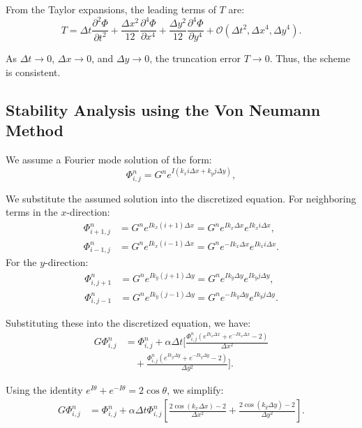 \documentclass{article}
\begin{document}
From the Taylor expansions, the leading terms of \( T \) are:
\begin{equation}
T = \Delta t \frac{\partial^2 \Phi}{\partial t^2} + \frac{\Delta x^2}{12} \frac{\partial^4 \Phi}{\partial x^4} + \frac{\Delta y^2}{12} \frac{\partial^4 \Phi}{\partial y^4} + \mathcal{O}(\Delta t^2, \Delta x^4, \Delta y^4).
\end{equation}

As \( \Delta t \to 0 \), \( \Delta x \to 0 \), and \( \Delta y \to 0 \), the truncation error \( T \to 0 \). Thus, the scheme is consistent.

\subsection{ Stability Analysis using the Von Neumann Method}
We assume a Fourier mode solution of the form:
\begin{equation}
\Phi_{i,j}^n = G^n e^{I(k_x i \Delta x + k_y j \Delta y)},
\end{equation}

We substitute the assumed solution into the discretized equation. For neighboring terms in the \( x \)-direction:
\begin{align}
\Phi_{i+1,j}^n &= G^n e^{I k_x (i+1) \Delta x} = G^n e^{I k_x \Delta x} e^{I k_x i \Delta x}, \\
\Phi_{i-1,j}^n &= G^n e^{I k_x (i-1) \Delta x} = G^n e^{-I k_x \Delta x} e^{I k_x i \Delta x}.
\end{align}
For the \( y \)-direction:
\begin{align}
\Phi_{i,j+1}^n &= G^n e^{I k_y (j+1) \Delta y} = G^n e^{I k_y \Delta y} e^{I k_y j \Delta y}, \\
\Phi_{i,j-1}^n &= G^n e^{I k_y (j-1) \Delta y} = G^n e^{-I k_y \Delta y} e^{I k_y j \Delta y}.
\end{align}

Substituting these into the discretized equation, we have:
\begin{align}
G \Phi_{i,j}^n &= \Phi_{i,j}^n + \alpha \Delta t \bigg[
\frac{\Phi_{i,j}^n (e^{I k_x \Delta x} + e^{-I k_x \Delta x} - 2)}{\Delta x^2} \nonumber \\
&\quad + \frac{\Phi_{i,j}^n (e^{I k_y \Delta y} + e^{-I k_y \Delta y} - 2)}{\Delta y^2}
\bigg].
\end{align}

Using the identity \( e^{I \theta} + e^{-I \theta} = 2 \cos \theta \), we simplify:
\begin{align}
G \Phi_{i,j}^n &= \Phi_{i,j}^n + \alpha \Delta t \Phi_{i,j}^n \left[
\frac{2 \cos(k_x \Delta x) - 2}{\Delta x^2} + \frac{2 \cos(k_y \Delta y) - 2}{\Delta y^2}
\right].
\end{align}
\end{document}
